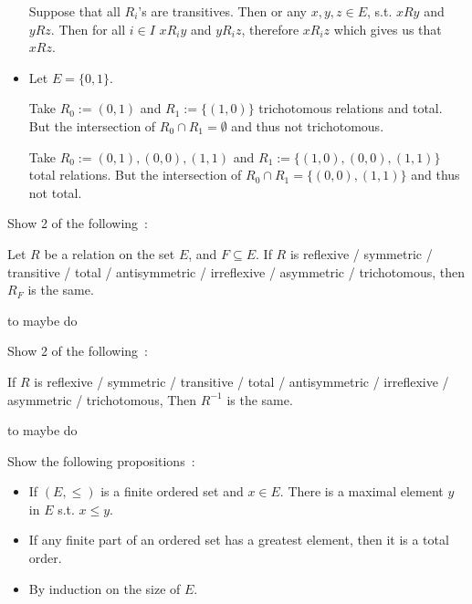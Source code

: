 \documentclass[a4paper,11pt]{exam}
\begin{document}
\begin{questions}
\begin{solution}
\begin{itemize}
				Suppose that all $R_i$'s are transitives. Then or any $x,y,z\in E$, s.t. $xRy$ and $yRz$. Then for all $i \in I$ $xR_iy$ and $yR_iz$, therefore $xR_iz$ which gives us that $xRz$.
				
				\item Let $E=\{0,1\}$.
				
				Take $R_0 := {(0,1)}$ and $R_1 := \{(1,0)\}$ trichotomous relations and total. But the intersection of $R_0 \cap R_1 = \emptyset$ and thus not trichotomous.
				
				Take $R_0 := {(0,1),(0,0),(1,1)}$ and $R_1 := \{(1,0),(0,0),(1,1)\}$ total relations. But the intersection of $R_0 \cap R_1 = \{(0,0),(1,1)\}$ and thus not total.
				
			\end{itemize}
		\end{solution}
		
		\question
		Show 2 of the following~:
		
		Let $R$ be a relation on the set $E$, and $F \subseteq E$.
		If $R$ is reflexive / symmetric / transitive / total / antisymmetric /
		irreflexive / asymmetric / trichotomous, then $R_F$ is the same.
		
		\begin{solution}
			to maybe do
		\end{solution}
		
		\question
		Show 2 of the following~:
		
		If $R$ is reflexive / symmetric / transitive / total / antisymmetric /
		irreflexive / asymmetric / trichotomous, Then $R^{-1}$ is the same.
		
		\begin{solution}
			to maybe do
		\end{solution}
		
		\question
		Show the following propositions~:
		\begin{itemize}
			\item If $(E,\leq)$ is a finite ordered set and $x \in E$. There is a maximal element $y$ in $E$ s.t. $x \leq y$.
			\item If any finite part of an ordered set has a greatest element, then it is a total order.
		\end{itemize}
		
		\begin{solution}
			\begin{itemize}
				\item By induction on the size of $E$. 
				

\end{itemize}
\end{solution}
\end{questions}
\end{document}
